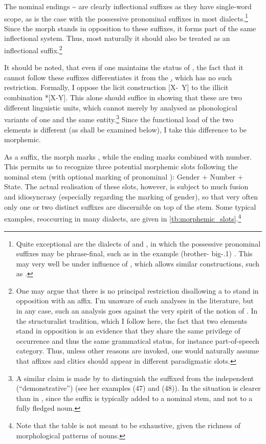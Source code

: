   The nominal endings \~ are clearly inflectional suffixes as they have single-word scope, as is the case with the possessive pronominal suffixes in most dialects.\footnote{Quite exceptional are the dialects of \JSan and \JSul, in which the possessive pronominal suffixes may be phrase-final, such as in the example  (brother-\free{} big-\poss.1\sg) \parencites[251]{KhanSanandaj}[262]{KhanSulemaniyya}. This may very well be under influence of \Sor, which allows similar constructions, such as  \citep[\War, ][81]{MacKenzie}.} 
  Since the \ed morph stands in opposition to these suffixes, it forms part of the same inflectional system. Thus, most naturally it should also be treated as an inflectional suffix.\footnote{One may argue that there is no principal restriction disallowing a  to stand in opposition with an affix. I'm unaware of such analyses in the literature, but in any case, such an analysis goes against the very spirit of the notion of . In the structuralist tradition, which I follow here, the fact that two elements stand in opposition is an evidence that they share the same privilege of occurrence and thus the same grammatical status, for instance part-of-speech category. Thus, unless other reasons are invoked, one would naturally assume that affixes and clitics should appear in different paradigmatic slots.}
  
  It should be noted, that even if one maintains the  status of \ed, the fact that it cannot follow these suffixes differentiates it from the  \d, which has no such restriction. Formally, I oppose the licit construction [X-\poss\ \dlnk Y] to the illicit combination *[X-\poss\ed Y]. This alone should suffice in showing that these are two different linguistic units, which cannot merely by analysed as phonological variants of one and the same entity.\footnote{A similar claim is made by \citet[357]{SamvelianHead} to distinguish the \Kur suffixed \ez* from the independent (\enquote{demonstrative}) \ez* (see her examples (47) and (48)). In  the situation is clearer than in \Kur, since the suffix \ed is typically added to a nominal stem, and not to a fully fledged noun.} Since the functional load of the two elements is different (as shall be examined below), I take this difference to be morphemic. 
  
 As a suffix, the \ed morph marks \cst*, while the  ending marks \free* combined with number.  This permits us to recognize three potential morphemic slots following the  nominal stem (with optional marking of pronominal \secns): Gender + Number + State. The actual realisation of these slots, however, is subject to much fusion and idiosyncrasy (especially regarding the marking of gender), so that very often only one or two distinct suffixes are discernible on top of the stem. Some typical examples, reoccurring in many dialects, are given in \vref{tb:morphemic_slots}.\footnote{Note that the table is not meant to be exhaustive, given the richness of morphological patterns of  nouns. }
 
